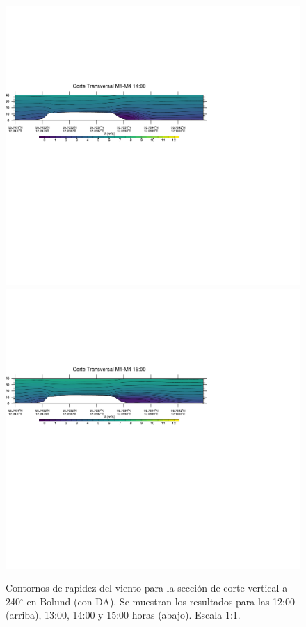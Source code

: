 \begin{figure}[H]
	\includegraphics[width=0.90\linewidth,trim={0mm 202.0mm 111mm 106mm},clip]{Imagenes/06/bol_da/1400rot}\\%
	\includegraphics[width=0.90\linewidth,trim={0mm 180.0mm 111mm 106mm},clip]{Imagenes/06/bol_da/1500rot}%
	\caption{Contornos de rapidez del viento para la sección de corte vertical a 240$^\circ$ en Bolund (con DA). Se muestran los resultados para las 12:00 (arriba), 13:00, 14:00 y 15:00 horas (abajo). Escala 1:1.}
	\label{fig:06_bol_da_cross}
\end{figure}
\vspace*{\fill}
\newpage

